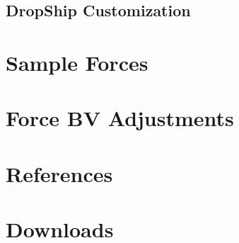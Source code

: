 \documentclass{article}
\newcommand{\mysectiontitle}{}
\newcommand{\newsection}[2]{\renewcommand{\mysectiontitle}{#2}\section{#1}}
\begin{document}


\subsection{DropShip Customization}



\newpage

\newsection{Sample Forces}{sample-forces}
\label{sec:sample_forces}



\newpage

\newsection{Force BV Adjustments}{bv-adjustments}
\label{sec:force_bv_adjustments}



\newpage

\newsection{References}{references}
\label{sec:references}



\newpage

\newsection{Downloads}{downloads}
\label{sec:downloads}



\newpage
\end{document}
